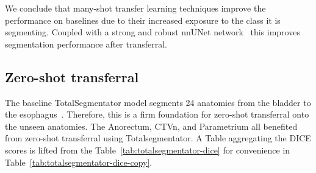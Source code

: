 \documentclass[11pt,twoside]{report}
\begin{document}
We conclude that many-shot transfer learning techniques improve the performance on baselines due to their increased exposure to the class it is segmenting. Coupled with a strong and robust nnUNet network~\cite{isensee2024nnunet, nnunet} this improves segmentation performance after transferral.

\subsection{Zero-shot transferral}\label{sec:totseg-zero-shot-transfer}

The baseline TotalSegmentator model segments 24 anatomies from the bladder to the esophagus~\cite{totalsegmentor-git}. Therefore, this is a firm foundation for zero-shot transferral onto the unseen anatomies. The Anorectum, CTVn, and Parametrium all benefited from zero-shot transferral using Totalsegmentator. A Table aggregating the DICE scores is lifted from the Table~\ref{tab:totalsegmentator-dice} for convenience in Table~\ref{tab:totalsegmentator-dice-copy}.

\begin{table}[h!]
  \centering
  \caption{DICE scores across each anatomy. Bold values highlight the best model for the anaotmy.}
  \label{tab:totalsegmentator-dice-copy}
\end{table}
\end{document}
